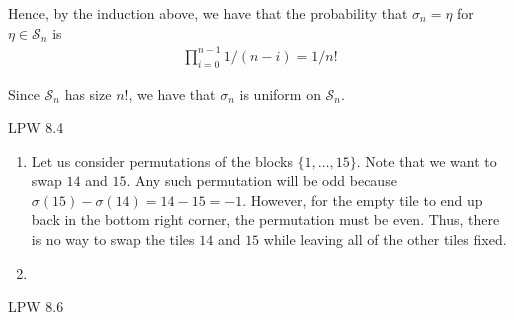 \documentclass[12pt]{article}
\newenvironment{problem}[2][Problem]{\begin{trivlist}
\item[\hskip \labelsep {\bfseries #1}\hskip \labelsep {\bfseries #2.}]}{\end{trivlist}}
\begin{document}
Hence, by the induction above, we have that the probability that $\sigma_n = \eta$ for $\eta \in \mathcal{S}_n$ is
\begin{align*}
 \prod_{i=0}^{n-1} 1/(n-i) = 1/n!
\end{align*}

Since $\mathcal{S}_n$ has size $n!$, we have that $\sigma_n$ is uniform on $\mathcal{S}_n$.

\begin{problem}{II}
LPW 8.4
\end{problem}

\begin{enumerate}[label=\alph*)]

\item Let us consider permutations of the blocks $\{1, \ldots, 15\}$. Note that we want to swap $14$ and $15$. Any such permutation will be odd because $\sigma(15) - \sigma(14) = 14 - 15 = -1$. However, for the empty tile to end up back in the bottom right corner, the permutation must be even. Thus, there is no way to swap the tiles $14$ and $15$ while leaving all of the other tiles fixed.

\item

\end{enumerate}

\begin{problem}{III}
LPW 8.6
\end{problem}
\end{document}
